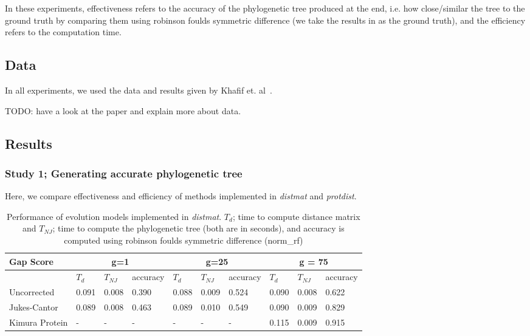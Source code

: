 \documentclass[11pt,letterpaper]{article}
\theoremstyle{definition}
\begin{document}
In these experiments, effectiveness refers to the accuracy of the phylogenetic tree produced at the end, i.e. how close/similar the tree to the ground truth by comparing them using robinson foulds symmetric difference \cite{robinson1981comparison} (we take the results in \cite{khafif2014identification} as the ground truth), and the efficiency refers to the computation time. 

\subsection{Data}

In all experiments, we used the data and results given by Khafif et. al~\cite{khafif2014identification}.

TODO: have a look at the paper and explain more about data. 

\subsection{Results}

\subsubsection{Study 1; Generating accurate phylogenetic tree}

Here, we compare effectiveness and efficiency of methods implemented in \textit{distmat} and \textit{protdist}.

\begin{table}[!h]
\centering
	\begin{tabular}{l|lll|lll|lll}

Gap Score	& \multicolumn{3}{c}{g=1} & \multicolumn{3}{c}{g=25} &  \multicolumn{3}{c}{g = 75} \\
\hline
&	$T_d$	& $T_{NJ}$	& accuracy &	$T_d$	& $T_{NJ}$	& accuracy &	$T_d$	& $T_{NJ}$	& accuracy \\
\hline
Uncorrected		&	0.091	&	0.008	&	0.390	&	0.088	&	0.009	&	0.524	&	0.090	&	0.008	&	0.622	\\
Jukes-Cantor	&	0.089	&	0.008	&	0.463	&	0.089	&	0.010	&	0.549	&	0.090	&	0.009	&	0.829	\\
Kimura Protein	&	-	&	-	&	-	&	-	&	-	&	-	&	0.115	&	0.009	&	0.915	\\
\hline
\end{tabular}
\caption{Performance of evolution models implemented in \textit{distmat}. 
$T_d$; time to compute distance matrix and $T_{NJ}$; time to compute the phylogenetic tree (both are in seconds), and accuracy is computed using robinson foulds symmetric difference \cite{robinson1981comparison} (norm\_rf)}\label{tab:dist1}
\end{table}
\end{document}
